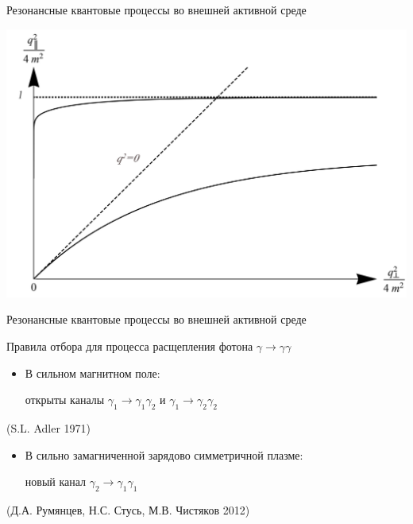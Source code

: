\documentclass{beamer}
\begin{document}
\begin{frame}{Резонансные квантовые процессы во внешней активной среде}
\begin{center}
\includegraphics[scale=0.45]{SelRules.jpg}
\end{center}
\end{frame}
\begin{frame}{Резонансные квантовые процессы во внешней активной среде}
\begin{center}
\alert{Правила отбора} для процесса расщепления фотона $\gamma\to\gamma\gamma$
\begin{itemize}

\item В сильном магнитном поле:

открыты каналы $\gamma_1\to\gamma_1 \gamma_2$ и $\gamma_1\to\gamma_2 \gamma_2$  
\end{itemize}

(S.L. Adler 1971)

\begin{itemize}
\item В сильно замагниченной зарядово симметричной плазме: 

новый канал $\gamma_2\to\gamma_1 \gamma_1$ 
\end{itemize}

(Д.А. Румянцев, Н.С. Стусь, М.В. Чистяков 2012)

\end{center}
\end{frame}
\end{document}
